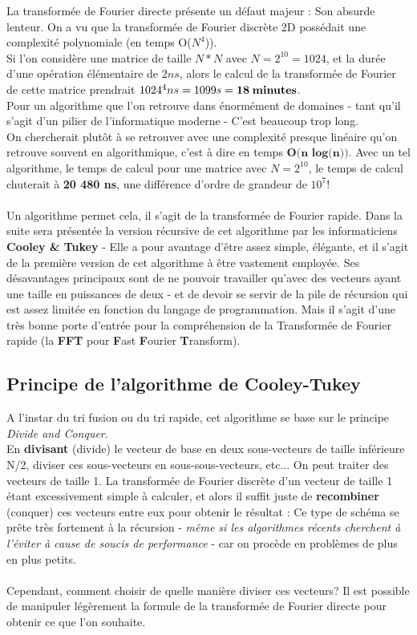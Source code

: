 \documentclass{article}
\begin{document}
La transformée de Fourier directe présente un défaut majeur : Son absurde lenteur. On a vu que la transformée de Fourier discrète 2D possédait une complexité polynomiale (en temps O($N^4$)).\\
Si l'on considère une matrice de taille $N*N$ avec $N = 2^{10} = 1024$, et la durée d'une opération élémentaire de $2ns$, alors le calcul de la transformée de Fourier de cette matrice prendrait $1024^4ns = 1099s = \textbf{18\:minutes}$.\\
Pour un algorithme que l'on retrouve dans énormément de domaines - tant qu'il s'agit d'un pilier de l'informatique moderne - C'est beaucoup trop long.\\
On chercherait plutôt à se retrouver avec une complexité presque linéaire qu'on retrouve souvent en algorithmique, c'est à dire en temps $\textbf{O(n log(n))}$. Avec un tel algorithme, le temps de calcul pour une matrice avec $N = 2^{10}$, le temps de calcul chuterait à \textbf{20 480 ns}, une différence d'ordre de grandeur de $10^7$!\\~\\
Un algorithme permet cela, il s'agit de la transformée de Fourier rapide. Dans la suite sera présentée la version récursive de cet algorithme par les informaticiens \textbf{Cooley \& Tukey} - Elle a pour avantage d'être assez simple, élégante, et il s'agit de la première version de cet algorithme à être vastement employée. Ses désavantages principaux sont de ne pouvoir travailler qu'avec des vecteurs ayant une taille en puissances de deux - et de devoir se servir de la pile de récursion qui est assez limitée en fonction du langage de programmation.
Mais il s'agit d'une très bonne porte d'entrée pour la compréhension de la Transformée de Fourier rapide (la \textbf{FFT} pour \textbf{F}ast \textbf{F}ourier \textbf{T}ransform).

\subsection{Principe de l'algorithme de Cooley-Tukey}

A l'instar du tri fusion ou du tri rapide, cet algorithme se base sur le principe \textit{Divide and Conquer}. \\
En \textbf{divisant} (divide) le vecteur de base en deux sous-vecteurs de taille inférieure N/2, diviser ces sous-vecteurs en sous-sous-vecteurs, etc... On peut traiter des vecteurs de taille 1. La transformée de Fourier discrète d'un vecteur de taille 1 étant excessivement simple à calculer, et alors il suffit juste de \textbf{recombiner} (conquer) ces vecteurs entre eux pour obtenir le résultat : Ce type de schéma se prête très fortement à la récursion - \textit{même si les algorithmes récents cherchent à l'éviter à cause de soucis de performance} - car on procède en problèmes de plus en plus petits.\\~\\
Cependant, comment choisir de quelle manière diviser ces vecteurs? Il est possible de manipuler légèrement la formule de la transformée de Fourier directe pour obtenir ce que l'on souhaite.
\end{document}
